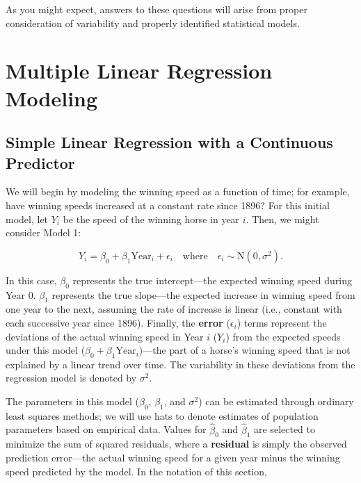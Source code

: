 \documentclass[
]{krantz}
\begin{document}
As you might expect, answers to these questions will arise from proper consideration of variability and properly identified statistical models.

\section{Multiple Linear Regression Modeling}\label{multreg}

\subsection{Simple Linear Regression with a Continuous Predictor}\label{SLRcontinuous}

We will begin by modeling the winning speed as a function of time; for example, have winning speeds increased at a constant rate since 1896? For this initial model, let \(Y_{i}\) be the speed of the winning horse in year \(i\). Then, we might consider Model 1:

\begin{equation}
 Y_{i}=\beta_{0}+\beta_{1}\textrm{Year}_{i}+\epsilon_{i} \quad \textrm{where} \quad \epsilon_{i}\sim \textrm{N}(0,\sigma^2).
\label{eq:model1}
\end{equation}

In this case, \(\beta_{0}\) represents the true intercept---the expected winning speed during Year 0. \(\beta_{1}\) represents the true slope---the expected increase in winning speed from one year to the next, assuming the rate of increase is linear (i.e., constant with each successive year since 1896). Finally, the \textbf{error} (\(\epsilon_{i}\))  terms represent the deviations of the actual winning speed in Year \(i\) (\(Y_i\)) from the expected speeds under this model (\(\beta_{0}+\beta_{1}\textrm{Year}_{i}\))---the part of a horse's winning speed that is not explained by a linear trend over time. The variability in these deviations from the regression model is denoted by \(\sigma^2\).

The parameters in this model (\(\beta_{0}\), \(\beta_{1}\), and \(\sigma^2\)) can be estimated through ordinary least squares methods; we will use hats to denote estimates of population parameters based on empirical data. Values for \(\hat{\beta}_{0}\) and \(\hat{\beta}_{1}\) are selected to minimize the sum of squared residuals, where a \textbf{residual}  is simply the observed prediction error---the actual winning speed for a given year minus the winning speed predicted by the model. In the notation of this section,
\end{document}
